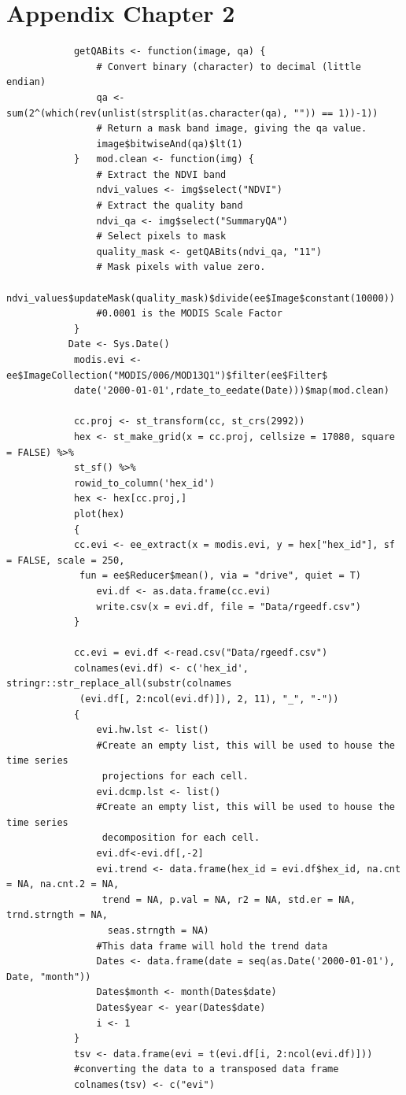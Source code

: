 \documentclass[12pt,a4paper]{book}
\begin{document}
	\chapter{Appendix  Chapter 2}
	\begin{shaded}
		\begin{verbatim}
			getQABits <- function(image, qa) {
				# Convert binary (character) to decimal (little endian)
				qa <- sum(2^(which(rev(unlist(strsplit(as.character(qa), "")) == 1))-1))
				# Return a mask band image, giving the qa value.
				image$bitwiseAnd(qa)$lt(1)
			}	mod.clean <- function(img) {
				# Extract the NDVI band
				ndvi_values <- img$select("NDVI")
				# Extract the quality band
				ndvi_qa <- img$select("SummaryQA")
				# Select pixels to mask
				quality_mask <- getQABits(ndvi_qa, "11")
				# Mask pixels with value zero.
				ndvi_values$updateMask(quality_mask)$divide(ee$Image$constant(10000))
				#0.0001 is the MODIS Scale Factor
			}
		   Date <- Sys.Date()			
			modis.evi <- ee$ImageCollection("MODIS/006/MOD13Q1")$filter(ee$Filter$
			date('2000-01-01',rdate_to_eedate(Date)))$map(mod.clean)			
			
			cc.proj <- st_transform(cc, st_crs(2992))
			hex <- st_make_grid(x = cc.proj, cellsize = 17080, square = FALSE) %>%
			st_sf() %>%
			rowid_to_column('hex_id')
			hex <- hex[cc.proj,]
			plot(hex)			
			{
			cc.evi <- ee_extract(x = modis.evi, y = hex["hex_id"], sf = FALSE, scale = 250,
			 fun = ee$Reducer$mean(), via = "drive", quiet = T)
				evi.df <- as.data.frame(cc.evi)
				write.csv(x = evi.df, file = "Data/rgeedf.csv")
			}
			
			cc.evi = evi.df <-read.csv("Data/rgeedf.csv")
			colnames(evi.df) <- c('hex_id', stringr::str_replace_all(substr(colnames
			 (evi.df[, 2:ncol(evi.df)]), 2, 11), "_", "-"))				
			{
				evi.hw.lst <- list() 
				#Create an empty list, this will be used to house the time series
				 projections for each cell. 
				evi.dcmp.lst <- list() 
				#Create an empty list, this will be used to house the time series
				 decomposition for each cell.
				evi.df<-evi.df[,-2]
				evi.trend <- data.frame(hex_id = evi.df$hex_id, na.cnt = NA, na.cnt.2 = NA,
				 trend = NA, p.val = NA, r2 = NA, std.er = NA, trnd.strngth = NA,
				  seas.strngth = NA) 
				#This data frame will hold the trend data
				Dates <- data.frame(date = seq(as.Date('2000-01-01'), Date, "month"))
				Dates$month <- month(Dates$date)
				Dates$year <- year(Dates$date)
				i <- 1
			}
			tsv <- data.frame(evi = t(evi.df[i, 2:ncol(evi.df)])) 
			#converting the data to a transposed data frame
			colnames(tsv) <- c("evi")
			

\end{verbatim}
\end{shaded}
\end{document}
